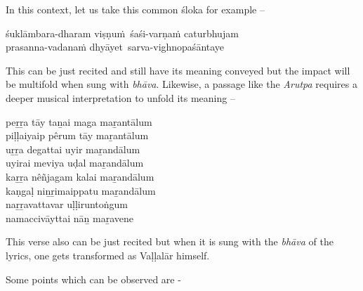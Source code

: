 In this context, let us take this common śloka for example –

\begin{myquote}
śuklāmbara-dharam viṣṇuṁ śaśi-varṇaṁ caturbhujam \\ prasanna-vadanaṁ dhyāyet sarva-vighnopaśāntaye  
\end{myquote}

This can be just recited and still have its meaning conveyed but the impact will be multifold when sung with \textit{bhāva}. Likewise, a passage like the \textit{Arutpa} requires a deeper musical interpretation to unfold its meaning –

\begin{myquote}
\end{myquote}

\begin{myquote}
peṟṟa tāy taṉai maga maṟantālum\\ piḷḷaiyaip pêrum tāy maṟantālum\\ uṟṟa degattai uyir maṟandālum\\ uyirai meviya uḍal maṟandālum\\ kaṟṟa nêñjagam kalai maṟandālum\\ kaṇgaḷ niṉṟimaippatu maṟandālum\\ naṟṟavattavar uḷḷiruntoṅgum\\ namaccivāyttai nāṉ maṟavene
\end{myquote}

This verse also can be just recited but when it is sung with the \textit{bhāva} of the lyrics, one gets transformed as Vaḷḷalār himself.

Some points which can be observed are -

\vspace{-.3cm}

